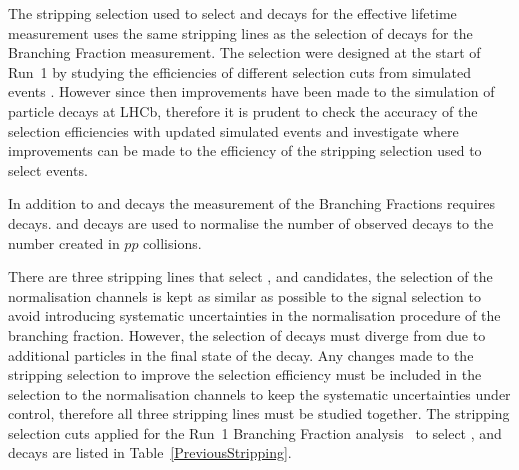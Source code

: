 The stripping selection used to select \bsmumu and \bhh decays for the \bsmumu effective lifetime measurement uses the same stripping lines as the selection of \bmumu decays for the Branching Fraction measurement. The selection were designed at the start of Run~1 by studying the efficiencies of different selection cuts from simulated events \cite{}. However since then improvements have been made to the simulation of particle decays at LHCb, therefore it is prudent to check the accuracy of the selection efficiencies with updated simulated events and investigate where improvements can be made to the efficiency of the stripping selection used to select \bsmumu events.


In addition to \bmumu and \bhh decays the measurement of the \bmumu Branching Fractions requires \bujpsik decays. \bdkpi and \bujpsik decays are used to normalise the number of observed \bsmumu decays to the number created in $pp$ collisions. 

There are three stripping lines that select \bmumu, \bujpsik and \bhh candidates, the selection of the normalisation channels is kept as similar as possible to the signal selection to avoid introducing systematic uncertainties in the normalisation procedure of the branching fraction. However, the selection of \bujpsik decays must diverge from \bsmumu due to additional particles in the final state of the decay. Any changes made to the \bmumu stripping selection to improve the selection efficiency must be included in the selection to the normalisation channels to keep the systematic uncertainties under control, therefore all three stripping lines must be studied together. The stripping selection cuts applied for the Run~1 Branching Fraction analysis~\cite{} to select \bmumu, \bhh and \bujpsik decays are listed in Table~\ref{PreviousStripping}.


